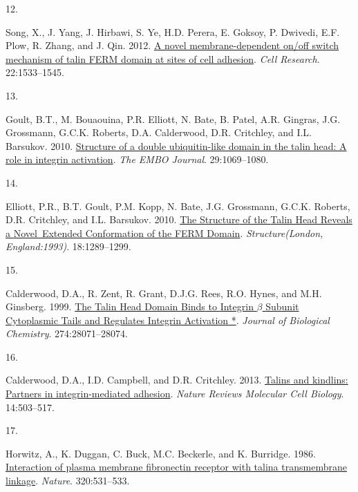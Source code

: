 \documentclass[
  twocolumn]{biophys-new-mod}
\newlength{\cslhangindent}
\newlength{\csllabelwidth}
\newlength{\cslentryspacingunit} %
\newenvironment{CSLReferences}[2] %
 {%
  \setlength{\parindent}{0pt}
  \ifodd #1
  \let\oldpar\par
  \def\par{\hangindent=\cslhangindent\oldpar}
  \fi
  \setlength{\parskip}{#2\cslentryspacingunit}
 }%
 {}
\newcommand{\CSLLeftMargin}[1]{\parbox[t]{\csllabelwidth}{#1}}
\newcommand{\CSLRightInline}[1]{\parbox[t]{\linewidth - \csllabelwidth}{#1}\break}
\begin{document}
\begin{CSLReferences}{0}{0}
\leavevmode{}%
\CSLLeftMargin{12. }%
\CSLRightInline{Song, X., J. Yang, J. Hirbawi, S. Ye, H.D. Perera, E.
Goksoy, P. Dwivedi, E.F. Plow, R. Zhang, and J. Qin. 2012.
\href{https://doi.org/10.1038/cr.2012.97}{A novel membrane-dependent
on/off switch mechanism of talin {FERM} domain at sites of cell
adhesion}. \emph{Cell Research}. 22:1533--1545.}

\leavevmode{}%
\CSLLeftMargin{13. }%
\CSLRightInline{Goult, B.T., M. Bouaouina, P.R. Elliott, N. Bate, B.
Patel, A.R. Gingras, J.G. Grossmann, G.C.K. Roberts, D.A. Calderwood,
D.R. Critchley, and I.L. Barsukov. 2010.
\href{https://doi.org/10.1038/emboj.2010.4}{Structure of a double
ubiquitin-like domain in the talin head: A role in integrin activation}.
\emph{The EMBO Journal}. 29:1069--1080.}

\leavevmode{}%
\CSLLeftMargin{14. }%
\CSLRightInline{Elliott, P.R., B.T. Goult, P.M. Kopp, N. Bate, J.G.
Grossmann, G.C.K. Roberts, D.R. Critchley, and I.L. Barsukov. 2010.
\href{https://doi.org/10.1016/j.str.2010.07.011}{The {Structure} of the
{Talin Head Reveals} a {Novel~Extended Conformation} of the {FERM
Domain}}. \emph{Structure(London, England:1993)}. 18:1289--1299.}

\leavevmode{}%
\CSLLeftMargin{15. }%
\CSLRightInline{Calderwood, D.A., R. Zent, R. Grant, D.J.G. Rees, R.O.
Hynes, and M.H. Ginsberg. 1999.
\href{https://doi.org/10.1074/jbc.274.40.28071}{The {Talin Head Domain
Binds} to {Integrin} {\(\beta\)} {Subunit Cytoplasmic Tails} and
{Regulates Integrin Activation} *}. \emph{Journal of Biological
Chemistry}. 274:28071--28074.}

\leavevmode{}%
\CSLLeftMargin{16. }%
\CSLRightInline{Calderwood, D.A., I.D. Campbell, and D.R. Critchley.
2013. \href{https://doi.org/10.1038/nrm3624}{Talins and kindlins:
Partners in integrin-mediated adhesion}. \emph{Nature Reviews Molecular
Cell Biology}. 14:503--517.}

\leavevmode{}%
\CSLLeftMargin{17. }%
\CSLRightInline{Horwitz, A., K. Duggan, C. Buck, M.C. Beckerle, and K.
Burridge. 1986. \href{https://doi.org/10.1038/320531a0}{Interaction of
plasma membrane fibronectin receptor with talin\textemdash a
transmembrane linkage}. \emph{Nature}. 320:531--533.}


\end{CSLReferences}
\end{document}
